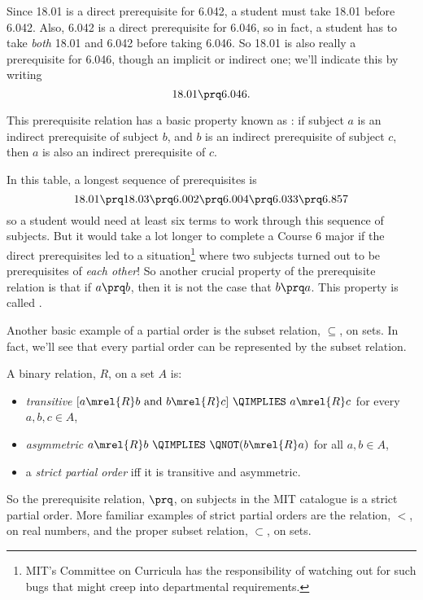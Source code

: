 Since 18.01 is a direct prerequisite for 6.042, a student must take 18.01
before 6.042.  Also, 6.042 is a direct prerequisite for 6.046, so in fact,
a student has to take \emph{both} 18.01 and 6.042 before taking 6.046.  So
18.01 is also really a prerequisite for 6.046, though an implicit or
indirect one; we'll indicate this by writing
\[
18.01 \prq 6.046.
\]

This prerequisite relation has a basic property known as
: if subject $a$ is an indirect prerequisite of
subject $b$, and $b$ is an indirect prerequisite of subject $c$, then
$a$ is also an indirect prerequisite of $c$.

In this table, a longest sequence of prerequisites is
\[
18.01 \prq 18.03 \prq 6.002 \prq 6.004 \prq 6.033 \prq 6.857
\]
so a student would need at least six terms to work through this sequence
of subjects.  But it would take a lot longer to complete a Course 6 major
if the direct prerequisites led to a situation\footnote{MIT's Committee on
Curricula has the responsibility of watching out for such bugs that might
creep into departmental requirements.} where two subjects turned out to be
prerequisites of \emph{each other}!  So another crucial property of the
prerequisite relation is that if $a \prq b$, then it is not the case that
$b \prq a$.  This property is called .

Another basic example of a partial order is the subset relation,
$\subseteq$, on sets.  In fact, we'll see that every partial order can be
represented by the subset relation.

\begin{definition}
A binary relation, $R$, on a set $A$ is:
\begin{itemize}

\item \emph{transitive} \qiff 
$[a \mrel{R}  b \text{ and } b \mrel{R}  c]\ \QIMPLIES\  a \mrel{R}  c$
\quad for every $a,b,c\in A$,

\item \emph{asymmetric} \qiff
$a \mrel{R}  b\  \QIMPLIES\  \QNOT(b \mrel{R}  a)$
\quad for all $a,b\in A$,

\item a \emph{strict partial order} iff it is transitive and asymmetric.
\end{itemize}

\end{definition}

So the prerequisite relation, $\prq$, on subjects in the MIT catalogue is
a strict partial order.  More familiar examples of strict partial orders
are the relation, $<$, on real numbers, and the proper subset relation,
$\subset$, on sets.
\fi

